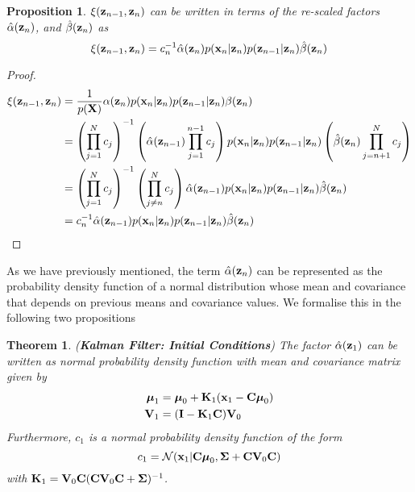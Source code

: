 \documentclass[11pt]{article}
\numberwithin{equation}{section}
\newcommand{\x}{{\bf x}}
\newcommand{\z}{{\bf z}}
\newtheorem{proposition}{Proposition}[section]
\newtheorem{theorem}{Theorem}[section]
\begin{document}
\begin{proposition}
	$\xi(\z_{n-1}, \z_n)$ can be written in terms of the re-scaled factors $\hat\alpha(\z_n)$, and $\hat\beta(\z_n)$ as
	\begin{equation}
		\xi(\z_{n-1}, \z_{n}) = c_n^{-1}\hat\alpha(\z_n)p(\x_n \vert \z_n) p(\z_{n-1}\vert \z_n)\hat\beta(\z_n)
	\end{equation}
\end{proposition}

\begin{proof}
	\begin{align}
		\xi(\z_{n-1}, \z_n) &= \frac{1}{p({\bf X})} \alpha(\z_n) p(\x_n \vert \z_n) p(\z_{n-1} \vert \z_n) \beta(\z_n) \\
		&= \left(\prod_{j=1}^N c_j\right)^{-1} \left(\hat\alpha(\z_{n-1}) \prod_{j=1}^{n-1} c_j\right)p(\x_n \vert \z_n) p(\z_{n-1} \vert \z_n)\left(\hat\beta(\z_n) \prod_{j={n+1}}^N c_j\right) \\
		&= \left(\prod_{j=1}^N c_j\right)^{-1} \left(\prod_{j\neq n}^N c_j\right) \hat\alpha(\z_{n-1}) p(\x_n \vert \z_n) p(\z_{n-1} \vert \z_n) \hat\beta(\z_n)\\
		&= c_n^{-1}\hat\alpha(\z_{n-1}) p(\x_n \vert \z_n) p(\z_{n-1} \vert \z_n) \hat\beta(\z_n)
	\end{align}
\end{proof}


As we have previously mentioned, the term $\hat\alpha(\z_n)$ can be represented as the probability density function of a normal distribution whose mean and covariance that depends on previous means and covariance values. We formalise this in the following two propositions

\begin{theorem} (\textbf{Kalman Filter: Initial Conditions}) \label{theorem:alpha-forward-equations-1}
	The factor $\hat\alpha(\z_1)$ can be written as normal probability density function with mean and covariance matrix given by
	\begin{align}
		\boldsymbol{\mu}_1 &= \boldsymbol{\mu}_0 + {\bf K}_1(\x_1 -{\bf C}\boldsymbol\mu_0)\\
		{\bf V}_1 &=  ({\bf I} - {\bf K}_1{\bf C}){\bf V}_0
	\end{align}
	Furthermore, $c_1$ is a normal probability density function of the form
	\begin{equation}
		c_1 = \mathcal{N}(\x_1\vert {\bf C}\boldsymbol\mu_0, \boldsymbol\Sigma + {\bf C} {\bf V}_0 {\bf C})
	\end{equation}
	with ${\bf K}_1 = {\bf V}_0{\bf C}({\bf C} {\bf V}_0 {\bf C} + \boldsymbol\Sigma)^{-1}$.
\end{theorem}
\end{document}

